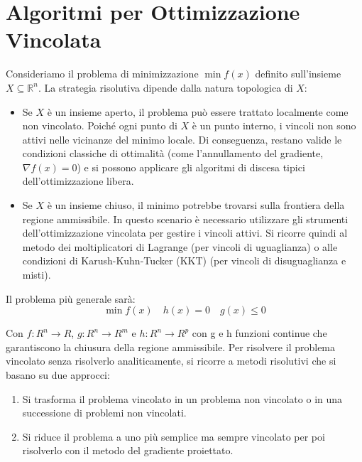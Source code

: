 \section{Algoritmi per Ottimizzazione Vincolata}
Consideriamo il problema di minimizzazione $\min f(x)$ definito sull'insieme $X \subseteq \mathbb{R}^n$.
La strategia risolutiva dipende dalla natura topologica di $X$:
\begin{itemize}
    \item Se $X$ è un insieme aperto, il problema può essere trattato localmente come non vincolato. Poiché ogni punto di $X$ è un punto interno, i vincoli non sono attivi nelle vicinanze del minimo locale. Di conseguenza, restano valide le condizioni classiche di ottimalità (come l'annullamento del gradiente, $\nabla f(x) = 0$) e si possono applicare gli algoritmi di discesa tipici dell'ottimizzazione libera.
    \item Se $X$ è un insieme chiuso, il minimo potrebbe trovarsi sulla frontiera della regione ammissibile. In questo scenario è necessario utilizzare gli strumenti dell'ottimizzazione vincolata per gestire i vincoli attivi. Si ricorre quindi al metodo dei moltiplicatori di Lagrange (per vincoli di uguaglianza) o alle condizioni di Karush-Kuhn-Tucker (KKT) (per vincoli di disuguaglianza e misti).
\end{itemize}
Il problema più generale sarà:
\[\min f(x) \quad h(x) = 0 \quad g(x)\leq 0\]

Con $f:R^n \rightarrow R$, $g: R^n \rightarrow R^m$ e $h:R^n \rightarrow R^p$ con g e h funzioni continue che garantiscono la chiusura della regione ammissibile.
Per risolvere il problema vincolato senza risolverlo analiticamente, si ricorre a metodi risolutivi che si basano su due approcci:
\begin{enumerate}
    \item Si trasforma il problema vincolato in un problema non vincolato o in una successione di problemi non vincolati.
    \item Si riduce il problema a uno più semplice ma sempre vincolato per poi risolverlo con il metodo del gradiente proiettato.
\end{enumerate}

